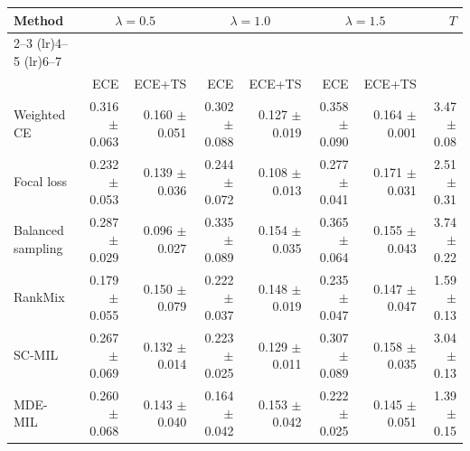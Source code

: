 \begin{tabular}{lrrrrrrr}
\toprule
Method & \multicolumn{2}{c}{$\lambda=0.5$} & \multicolumn{2}{c}{$\lambda=1.0$} & \multicolumn{2}{c}{$\lambda=1.5$} & $T$ \\ \cmidrule(lr){2--3} \cmidrule(lr){4--5} \cmidrule(lr){6--7}\\
 & ECE & ECE+TS & ECE & ECE+TS & ECE & ECE+TS & \\
\midrule
Weighted CE & \num{0.316} $\pm$ \num{0.063} & \num{0.160} $\pm$ \num{0.051} & \num{0.302} $\pm$ \num{0.088} & \num{0.127} $\pm$ \num{0.019} & \num{0.358} $\pm$ \num{0.090} & \num{0.164} $\pm$ \num{0.001} & \num{3.47} $\pm$ \num{0.08}\\
Focal loss & \num{0.232} $\pm$ \num{0.053} & \num{0.139} $\pm$ \num{0.036} & \num{0.244} $\pm$ \num{0.072} & \num{0.108} $\pm$ \num{0.013} & \num{0.277} $\pm$ \num{0.041} & \num{0.171} $\pm$ \num{0.031} & \num{2.51} $\pm$ \num{0.31}\\
Balanced sampling & \num{0.287} $\pm$ \num{0.029} & \num{0.096} $\pm$ \num{0.027} & \num{0.335} $\pm$ \num{0.089} & \num{0.154} $\pm$ \num{0.035} & \num{0.365} $\pm$ \num{0.064} & \num{0.155} $\pm$ \num{0.043} & \num{3.74} $\pm$ \num{0.22}\\
RankMix & \num{0.179} $\pm$ \num{0.055} & \num{0.150} $\pm$ \num{0.079} & \num{0.222} $\pm$ \num{0.037} & \num{0.148} $\pm$ \num{0.019} & \num{0.235} $\pm$ \num{0.047} & \num{0.147} $\pm$ \num{0.047} & \num{1.59} $\pm$ \num{0.13}\\
SC-MIL & \num{0.267} $\pm$ \num{0.069} & \num{0.132} $\pm$ \num{0.014} & \num{0.223} $\pm$ \num{0.025} & \num{0.129} $\pm$ \num{0.011} & \num{0.307} $\pm$ \num{0.089} & \num{0.158} $\pm$ \num{0.035} & \num{3.04} $\pm$ \num{0.13}\\
MDE-MIL & \num{0.260} $\pm$ \num{0.068} & \num{0.143} $\pm$ \num{0.040} & \num{0.164} $\pm$ \num{0.042} & \num{0.153} $\pm$ \num{0.042} & \num{0.222} $\pm$ \num{0.025} & \num{0.145} $\pm$ \num{0.051} & \num{1.39} $\pm$ \num{0.15}\\
\bottomrule
\end{tabular}
